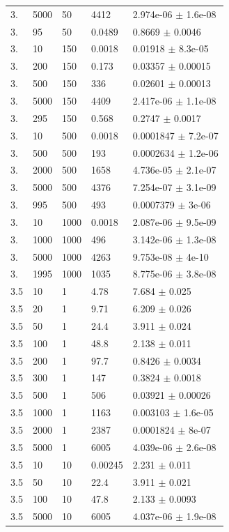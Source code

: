 \begin{longtable}{lllll}
	3. & 5000 & 50 & 4412 & 2.974e-06 $\pm$ 1.6e-08 \\
	3. & 95 & 50 & 0.0489 & 0.8669 $\pm$ 0.0046 \\
	3. & 10 & 150 & 0.0018 & 0.01918 $\pm$ 8.3e-05 \\
	3. & 200 & 150 & 0.173 & 0.03357 $\pm$ 0.00015 \\
	3. & 500 & 150 & 336 & 0.02601 $\pm$ 0.00013 \\
	3. & 5000 & 150 & 4409 & 2.417e-06 $\pm$ 1.1e-08 \\
	3. & 295 & 150 & 0.568 & 0.2747 $\pm$ 0.0017 \\
	3. & 10 & 500 & 0.0018 & 0.0001847 $\pm$ 7.2e-07 \\
	3. & 500 & 500 & 193 & 0.0002634 $\pm$ 1.2e-06 \\
	3. & 2000 & 500 & 1658 & 4.736e-05 $\pm$ 2.1e-07 \\
	3. & 5000 & 500 & 4376 & 7.254e-07 $\pm$ 3.1e-09 \\
	3. & 995 & 500 & 493 & 0.0007379 $\pm$ 3e-06 \\
	3. & 10 & 1000 & 0.0018 & 2.087e-06 $\pm$ 9.5e-09 \\
	3. & 1000 & 1000 & 496 & 3.142e-06 $\pm$ 1.3e-08 \\
	3. & 5000 & 1000 & 4263 & 9.753e-08 $\pm$ 4e-10 \\
	3. & 1995 & 1000 & 1035 & 8.775e-06 $\pm$ 3.8e-08 \\
	3.5 & 10 & 1 & 4.78 & 7.684 $\pm$ 0.025 \\
	3.5 & 20 & 1 & 9.71 & 6.209 $\pm$ 0.026 \\
	3.5 & 50 & 1 & 24.4 & 3.911 $\pm$ 0.024 \\
	3.5 & 100 & 1 & 48.8 & 2.138 $\pm$ 0.011 \\
	3.5 & 200 & 1 & 97.7 & 0.8426 $\pm$ 0.0034 \\
	3.5 & 300 & 1 & 147 & 0.3824 $\pm$ 0.0018 \\
	3.5 & 500 & 1 & 506 & 0.03921 $\pm$ 0.00026 \\
	3.5 & 1000 & 1 & 1163 & 0.003103 $\pm$ 1.6e-05 \\
	3.5 & 2000 & 1 & 2387 & 0.0001824 $\pm$ 8e-07 \\
	3.5 & 5000 & 1 & 6005 & 4.039e-06 $\pm$ 2.6e-08 \\
	3.5 & 10 & 10 & 0.00245 & 2.231 $\pm$ 0.011 \\
	3.5 & 50 & 10 & 22.4 & 3.911 $\pm$ 0.021 \\
	3.5 & 100 & 10 & 47.8 & 2.133 $\pm$ 0.0093 \\
	3.5 & 5000 & 10 & 6005 & 4.037e-06 $\pm$ 1.9e-08 \\

\end{longtable}
